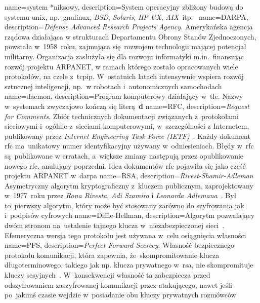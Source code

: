 {
	name={system \mbox{*niksowy}},
	description={System operacyjny zbliżony budową do systemu \gls{unix}, np.~\gls{gnulinux}, \emph{BSD}, \emph{Solaris}, \emph{HP-UX}, \emph{AIX}~itp.~\cite{wiki:unix-like}}
}
{
	name={DARPA},
	description={\emph{Defense Advanced Research Projects Agency}. Amerykańska agencja rządowa działająca w strukturach Departamentu Obrony Stanów Zjednoczonych, powstała w~1958~roku, zajmująca się~rozwojem technologii mającej potencjał militarny. Organizacja zasłużyła się dla rozwoju informatyki m.in.~finansując rozwój projektu ARPANET, w ramach którego zostało opracowanych wiele protokołów, na czele z~\gls{tcpip}. W~ostatnich latach intensywnie wspiera rozwój sztucznej inteligencji, np.~w robotach i~autonomicznych samochodach~\cite{darpa-grandchallange,darpa-robotics-challange,darpa-robotics-challange-ieee}}
}
{
	name={daemon},
	description={Program komputerowy działający w~tle. Nazwy  w~systemach  zwyczajowo kończą się literą~\textbf{d}}
}
{
	name={RFC},
	description={\emph{Request for Comments}. Zbiór technicznych dokumentacji związanych z~protokołami sieciowymi i~ogólnie z~sieciami komputerowymi, w~szczególności z Internetem, publikowany przez \emph{Internet Engineering Task Force (IETF)}~\cite{rfc-editor}. Każdy dokument \gls{rfc} ma~unikatowy numer identyfikacyjny używany w~odniesieniach. Błędy w~\gls{rfc} są~publikowane w erratach, a~większe zmiany następują przez opublikowanie nowego \gls{rfc}, anulujący poprzedni. Idea dokumentów \gls{rfc} pojawiła się jako część projektu ARPANET w~\gls{darpa}}
}
{
	name={RSA},
	description={\emph{Rivest-Shamir-Adleman} Asymetryczny algorytm kryptograficzny z~kluczem publicznym, zaprojektowany w~1977~roku przez \emph{Rona Rivesta}, \emph{Adi Szamira} i \emph{Leonarda Adlemana}~\cite{wiki:rsa,rsa}. Był to~pierwszy algorytm, który może być stosowany zarówno do szyfrowania jak i~podpisów cyfrowych}
}
{
	name={Diffie-Hellman},
	description={Algorytm pozwalający dwóm stronom na~ustalenie tajnego klucza w~niezabezpieczonej sieci~\cite{mimuw-ssl-w04}. Efemeryczna wersja tego protokołu jest używana w~celu osiągnięcia własności }
}
{
	name={PFS},
	description={\emph{Perfect Forward Secrecy}. Własność bezpiecznego protokołu komunikacji, która zapewnia, że~skompromitowanie klucza długoterminowego, takiego jak np. klucza prywatnego w~\gls{rsa}, nie skompromituje kluczy sesyjnych~\cite{wiki:pfs}. W~konsekwencji własność ta zabezpiecza przed odszyfrowaniem zaszyfrowanej komunikacji przez atakującego, nawet jeśli po~jakimś czasie wejdzie w~posiadanie obu kluczy prywatnych rozmówców}
}
